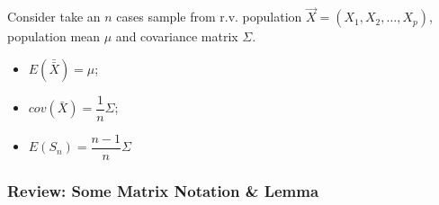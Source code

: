     Consider take an $ n $ cases sample from r.v. population $ \vec{X}=(X_1,X_2,\ldots,X_p) $, population mean $ \mu $ and covariance matrix $ \Sigma  $.
    \begin{itemize}[topsep=6pt,itemsep=4pt]
        \item $ E(\bar{\bar{X}})=\mu $;
        \item $ cov(\bar{X})=\dfrac{1}{n}\Sigma  $;
        \item $ E(S_n)=\dfrac{n-1}{n}\Sigma  $
    \end{itemize}
    
        


\subsubsection{Review: Some Matrix Notation \& Lemma}


